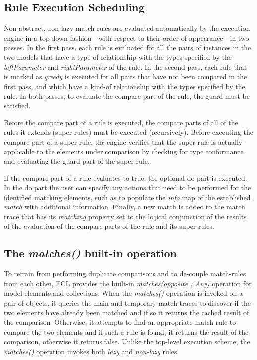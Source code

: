 \subsection{Rule Execution Scheduling}

Non-abstract, non-lazy match-rules are evaluated automatically by the execution engine in a top-down fashion - with respect to their order of appearance - in two passes. In the first pass, each rule is evaluated for all the pairs of instances in the two models that have a type-of relationship with the types specified by the \emph{leftParameter} and \emph{rightParameter} of the rule. In the second pass, each rule that is marked as \emph{greedy} is executed for all pairs that have not been compared in the first pass, and which have a kind-of relationship with the types specified by the rule. In both passes, to evaluate the compare part of the rule, the guard must be satisfied.

Before the compare part of a rule is executed, the compare parts of all of the rules it extends (super-rules) must be executed (recursively). Before executing the compare part of a super-rule, the engine verifies that the super-rule is actually applicable to the elements under comparison by checking for type conformance and evaluating the guard part of the super-rule.

If the compare part of a rule evaluates to true, the optional do part is executed. In the do part the user can specify any actions that need to be performed for the identified matching elements, such as to populate the \emph{info} map of the established \emph{match} with additional information. Finally, a new match is added to the match trace that has its \emph{matching} property set to the logical conjunction of the results of the evaluation of the compare parts of the rule and its super-rules.

\subsection{The \emph{matches()} built-in operation}

To refrain from performing duplicate comparisons and to de-couple match-rules from each other, ECL provides the built-in \emph{matches(opposite : Any)} operation for model elements and collections. When the \emph{matches()} operation is invoked on a pair of objects, it queries the main and temporary match-traces to discover if the two elements have already been matched and if so it returns the cached result of the comparison. Otherwise, it attempts to find an appropriate match rule to compare the two elements and if such a rule is found, it returns the result of the comparison, otherwise it returns false. Unlike the top-level execution scheme, the \emph{matches()} operation invokes both \emph{lazy} and \emph{non-lazy} rules.

